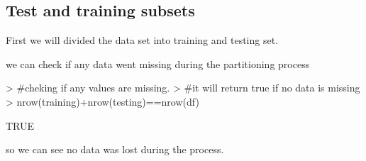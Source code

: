 \documentclass{article}
\begin{document}
\subsection{Test and training subsets}
First we will divided the data set into training and testing set. 
\begin{Schunk}
\end{Schunk}
we can check if any data went missing during the partitioning process
\begin{Schunk}
\begin{Sinput}
> #cheking if any values are missing.
> #it will return true if no data is missing
> nrow(training)+nrow(testing)==nrow(df)
\end{Sinput}
\begin{Soutput}
[1] TRUE
\end{Soutput}
\end{Schunk}
so we can see no data was lost during the process.
\end{document}
